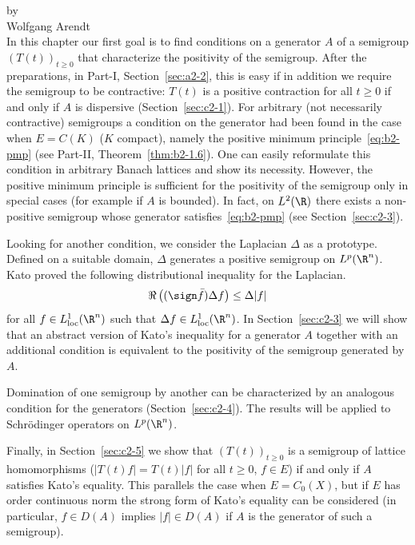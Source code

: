 \label{chap:c2}
\thispagestyle{empty}%
{\Large
\vspace*{-.75cm}
by \\[.25em]
Wolfgang Arendt
\vspace{.75cm}
\\
}
In this chapter our first goal is to find conditions on a generator $A$ of a semigroup $(T(t))_{t \geq 0}$ that characterize the positivity of the semigroup. After the preparations, in Part-I, Section~\ref{sec:a2-2}, this is easy if in addition we require the semigroup to be contractive: $T(t)$ is a positive contraction for all $t \geq 0$ if and only if $A$ is dispersive (Section~\ref{sec:c2-1}). 
For arbitrary (not necessarily contractive) semigroups a condition on the generator had been found in the case when $E = C(K)$ ($K$ compact), namely the positive minimum principle~\eqref{eq:b2-pmp} (see Part-II, Theorem~\ref{thm:b2-1.6}). 
One can easily reformulate this condition in arbitrary Banach lattices and show its necessity. 
However, the positive minimum principle is sufficient for the positivity of the semigroup only in special cases (for example if\/ $A$ is bounded). 
In fact, on $L^{2}(\R)$ there exists a non-positive semigroup whose generator satisfies~\eqref{eq:b2-pmp} (see Section~\ref{sec:c2-3}).

Looking for another condition, we consider the Laplacian $\Delta$ as a prototype.
Defined on a suitable domain, $\Delta$ generates a positive semigroup on $L^p(\R^n)$.
Kato proved the following distributional inequality for the Laplacian.
\[
\Re \left( (\sign \bar{f}) \Delta f \right) \leq \Delta|f|
\]
for all $f \in L^1_{\text{loc}}(\R^{n})$ such that $\Delta f \in L^1_{\text{loc}}(\R^{n})$.
In Section~\ref{sec:c2-3} we will show that an abstract version of Kato's inequality for a generator $A$ together with an additional condition is equivalent to the positivity of the semigroup generated by $A$.

Domination of one semigroup by another can be characterized by an analogous condition for the generators (Section~\ref{sec:c2-4}).
The results will be applied to Schrödinger operators on $L^p(\R^n)$.

Finally, in Section~\ref{sec:c2-5} we show that $(T(t))_{t \geq 0}$ is a semigroup of lattice homomorphisms (\ie $|T(t) f| = T(t) |f|$ for all $t \geq 0$, $f \in E$) if and only if\/ $A$ satisfies Kato's equality.
This parallels the case when $E = C_{0}(X)$, but if\/ $E$ has order continuous norm the strong form of Kato's equality can be considered (in particular, $f \in D(A)$ implies $|f| \in D(A)$ if\/ $A$ is the generator of such a semigroup).
